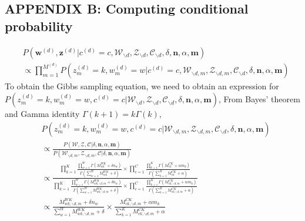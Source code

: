 \documentclass[a4paper]{article}
\begin{document}
\subsection*{APPENDIX B: Computing conditional probability}
\begin{equation}
\begin{aligned}
& P(\boldsymbol{w}^{(d)}, \boldsymbol{z}^{(d)}|c^{(d)}=c, \mathcal{W}_{\backslash d}, \mathcal{Z}_{\backslash d}, \mathcal{C}_{\backslash d}, \delta, \boldsymbol{n}, \alpha, \boldsymbol{m}) \\& \propto \prod_{m=1}^{M^{(d)}}P(z^{(d)}_m=k, w^{(d)}_m=w| c^{(d)}=c, \mathcal{W}_{\backslash d, m}, \mathcal{Z}_{\backslash d,m}, \mathcal{C}_{\backslash d}, \delta, \boldsymbol{n}, \alpha, \boldsymbol{m})
\end{aligned}
\end{equation} 
To obtain the Gibbs sampling equation, we need to obtain an expression for $P(z^{(d)}_m=k,  w^{(d)}_m=w, c^{(d)}=c|\mathcal{W}_{\backslash d}, \mathcal{Z}_{\backslash d}, \mathcal{C}_{\backslash d}, \delta, \boldsymbol{n}, \alpha, \boldsymbol{m})$,
 From Bayes' theorem and Gamma identity $\Gamma(k+1)=k\Gamma(k)$,
\begin{equation}
\begin{aligned}
& P(z^{(d)}_m=k, w^{(d)}_m=w, c^{(d)}=c|\mathcal{W}_{\backslash d, m}, \mathcal{Z}_{\backslash d,m}, \mathcal{C}_{\backslash d}, \delta, \boldsymbol{n}, \alpha, \boldsymbol{m}) \\& \propto 
\frac{P(\mathcal{W}, \mathcal{Z}, \mathcal{C}|\delta, \boldsymbol{n}, \alpha, \boldsymbol{m})}{P(\mathcal{W}_{\backslash d, m}, \mathcal{Z}_{\backslash d, m}, \mathcal{C}|\delta, \boldsymbol{n}, \alpha, \boldsymbol{m})}\\& \propto \frac{\prod_{k=1}^{K}\frac{\prod_{w=1}^W\Gamma(M_{wk}^{WK}+\delta n_w)}{\Gamma(\sum_{w=1}^WM_{wk}^{WK}+\delta )}\times\prod_{c=1}^{C}\frac{\prod_{k=1}^K\Gamma(M^{CK}_{ck}+\alpha m_k)}{\Gamma(\sum_{k=1}^KM^{CK}_{ck}+\alpha)}}{\prod_{k=1}^{K}\frac{\prod_{w=1}^W\Gamma(M_{wk, \backslash d, m}^{WK}+\delta n_w)}{\Gamma(\sum_{w=1}^WM_{wk, \backslash d, m}^{WK}+\delta )}\times\prod_{c=1}^{C}\frac{\prod_{k=1}^K\Gamma(M^{CK}_{ck, \backslash d, m}+\alpha m_k)}{\Gamma(\sum_{k=1}^KM^{CK}_{ck, \backslash d, m}+\alpha)}}\\ & \propto 
\frac{M_{wk, \backslash d, m}^{WK}+\delta n_w}{\sum_{w=1}^WM_{wk,  \backslash d, m}^{WK}+\delta}\times\frac{M^{CK}_{ck, \backslash d, m}+\alpha m_k}{\sum_{k=1}^KM^{CK}_{ck, \backslash d, m}+\alpha}
\end{aligned}
\end{equation}
\end{document}
